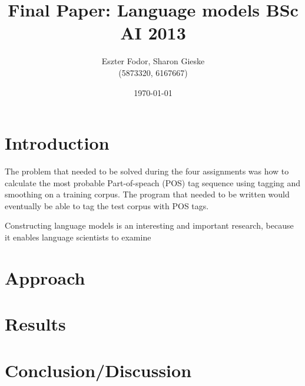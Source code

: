 \documentclass[11pt, a4paper]{article}
\title{Final Paper: Language models BSc AI 2013}
\author{Eszter Fodor, Sharon Gieske \\ (5873320, 6167667)}
\date{\today}
\begin{document}
\maketitle{}


\section*{Introduction}
The problem that needed to be solved during the four assignments was how to calculate the most
probable Part-of-speach (POS) tag sequence using tagging and smoothing on a training corpus. The
program that needed to be written would eventually be able to tag the test corpus with POS tags.

Constructing language models is an interesting and important research, because it enables language
scientists to examine 

\section*{Approach}



\section*{Results}


\section*{Conclusion/Discussion}
\end{document}
